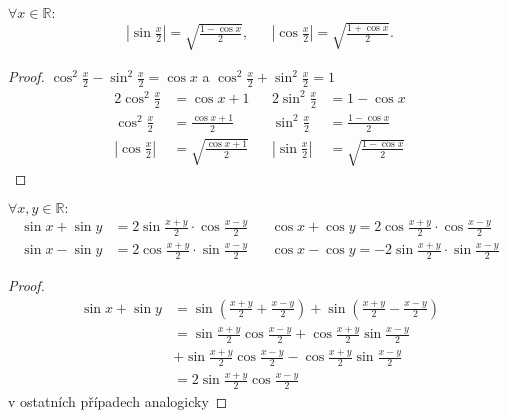 \begin{veta}
    $\forall x \in \mathbb{R}:$
    \begin{align*}
        \left| \sin \frac{x}{2} \right| = \sqrt{\frac{1-\cos x}{2}}, & & \left| \cos \frac{x}{2}\right| = \sqrt{\frac{1+\cos x}{2}}.
    \end{align*}
\end{veta}

\begin{proof}
  $\cos^2 \frac{x}{2} - \sin^2 \frac{x}{2} = \cos x$ a
  $\cos^2 \frac{x}{2} + \sin^2 \frac{x}{2} =1 $
  \begin{align*}
    2\cos^2 \frac{x}{2}&=\cos x +1 & & 2\sin^2 \frac{x}{2}&=1-\cos x \\
    \cos^2 \frac{x}{2}&=\frac{\cos x +1}{2} & & \sin^2 \frac{x}{2}&=\frac{1-\cos x }{2} \\
    \left| \cos \frac{x}{2} \right| &= \sqrt{\frac{\cos x +1}{2}} & & \left| \sin \frac{x}{2} \right| &= \sqrt{\frac{1-\cos x}{2}}
  \end{align*}
\end{proof}

\begin{veta}
  $\forall x,y \in \mathbb{R}:$
  \begin{align*}
    \sin x + \sin y &= 2\sin \frac{x+y}{2}\cdot \cos \frac{x-y}{2}& & \cos x + \cos y = 2 \cos \frac{x + y}{2}\cdot \cos \frac{x - y}{2}\\
    \sin x - \sin y &= 2\cos \frac{x + y}{2}\cdot \sin \frac{x - y}{2}& & \cos x - \cos y =-2\sin \frac{x + y}{2}\cdot \sin \frac{x -y}{2}
  \end{align*}
\end{veta}

\begin{proof}
    \begin{align*}
        \sin x + \sin y & = \sin \left(\frac{x+y}{2}+\frac{x-y}{2}\right)+ \sin \left(\frac{x+y}{2}-\frac{x-y}{2}\right ) \\
        & = \sin \frac{x+y}{2} \cos\frac{x-y}{2} + \cos\frac{x+y}{2} \sin \frac{x-y}{2} \\
        & + \sin \frac{x+y}{2} \cos\frac{x-y}{2} -  \cos\frac{x+y}{2} \sin \frac{x-y}{2}\\
        & = 2\sin \frac{x+y}{2} \cos\frac{x-y}{2}
    \end{align*}
  v ostatních případech analogicky
\end{proof}
